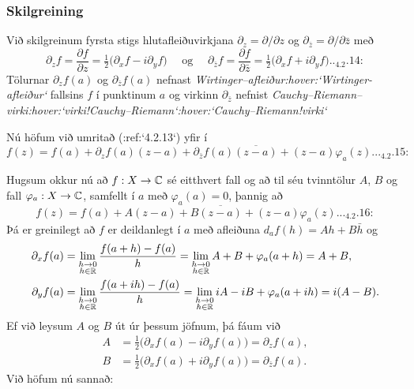 \subsubsection{Skilgreining}  Við skilgreinum fyrsta stigs hlutafleiðuvirkjana
${\partial}_z={\partial}/{\partial}z$ og 
${\partial}_{\bar z}={\partial}/{\partial}\bar z$ með
\begin{equation*}
{\partial}_zf=\dfrac{{\partial}f}{{\partial} z}
=\tfrac 12\big({\partial}_xf-i{\partial}_yf\big) \quad \text{ og } \quad
{\partial}_{\bar z}f=\dfrac{{\partial}f}{{\partial}\bar z}
=\tfrac 12\big({\partial}_xf+i{\partial}_yf\big)


.. _4.2.14:

\end{equation*}
Tölurnar ${\partial}_zf(a)$ og ${\partial}_{\bar z}f(a)$ nefnast
{\it Wirtinger--afleiður:hover:`Wirtinger-afleiður`} fallsins $f$ í punktinum $a$ og virkinn
${\partial}_{\bar z}$ nefnist {\it
Cauchy--Riemann--virki:hover:`virki!Cauchy--Riemann`:hover:`Cauchy--Riemann!virki`}


Nú höfum við umritað (:ref:`4.2.13`) yfir í
\begin{equation}
f(z)=f(a)+{\partial}_zf(a)(z-a)+{\partial}_{\bar z}f(a)\overline{(z-a)}
+ (z-a)\varphi_a(z).


.. _4.2.15:

\end{equation}



Hugsum okkur nú að $f:X\to {\mathbb C}$ sé eitthvert fall og að til séu
tvinntölur $A$, $B$ og fall $\varphi_a:X\to {\mathbb C}$, samfellt í $a$ með
$\varphi_a(a)=0$, þannig að
\begin{equation}
f(z)=f(a)+A(z-a)+B\overline{(z-a)}+(z-a)\varphi_a(z).


.. _4.2.16:

\end{equation} 
Þá er greinilegt að $f$ er deildanlegt í $a$ með afleiðuna
$d_af(h)=Ah+B\bar h$ og
\begin{align*}
{\partial}_xf(a) &=
\lim_{\substack{ h\to 0\\ h\in {\mathbb R}}} \dfrac{f(a+h)-f(a)}h
=\lim_{\substack{ h\to 0\\ h\in {\mathbb R}}} A+B+\varphi_a(a+h) = A+B,\\
{\partial}_yf(a) &=
\lim_{\substack{ h\to 0\\ h\in {\mathbb R}}} \dfrac{f(a+ih)-f(a)}h
=\lim_{\substack{ h\to 0\\ h\in {\mathbb R}}} iA-iB+\varphi_a(a+ih) = i(A-B).
\end{align*}
Ef við leysum $A$ og $B$ út úr þessum jöfnum, þá fáum við
\begin{align*}
A&= \tfrac 12\big({\partial}_xf(a)-i{\partial}_yf(a)\big)
={\partial}_zf(a),\\
B&= \tfrac 12\big({\partial}_xf(a)+i{\partial}_yf(a)\big)
={\partial}_{\bar z}f(a).
\end{align*}
Við höfum nú sannað:

